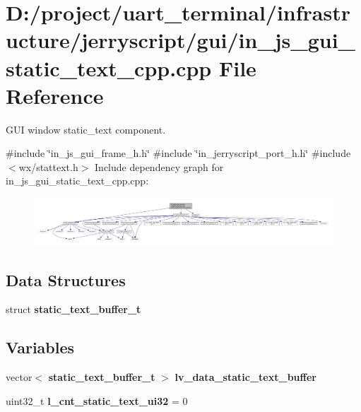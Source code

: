 \section{D\+:/project/uart\+\_\+terminal/infrastructure/jerryscript/gui/in\+\_\+js\+\_\+gui\+\_\+static\+\_\+text\+\_\+cpp.cpp File Reference}
\label{in__js__gui__static__text__cpp_8cpp}


G\+UI window static\+\_\+text component.  


{\ttfamily \#include \char`\"{}in\+\_\+js\+\_\+gui\+\_\+frame\+\_\+h.\+h\char`\"{}}\newline
{\ttfamily \#include \char`\"{}in\+\_\+jerryscript\+\_\+port\+\_\+h.\+h\char`\"{}}\newline
{\ttfamily \#include $<$wx/stattext.\+h$>$}\newline
Include dependency graph for in\+\_\+js\+\_\+gui\+\_\+static\+\_\+text\+\_\+cpp.\+cpp\+:\nopagebreak
\begin{figure}[H]
\begin{center}
\leavevmode
\includegraphics[width=350pt]{in__js__gui__static__text__cpp_8cpp__incl}
\end{center}
\end{figure}
\subsection*{Data Structures}
\begin{DoxyCompactItemize}
\item 
struct \textbf{ static\+\_\+text\+\_\+buffer\+\_\+t}
\end{DoxyCompactItemize}
\subsection*{Variables}
\begin{DoxyCompactItemize}
\item 
vector$<$ \textbf{ static\+\_\+text\+\_\+buffer\+\_\+t} $>$ \textbf{ lv\+\_\+data\+\_\+static\+\_\+text\+\_\+buffer}
\item 
uint32\+\_\+t {\bfseries l\+\_\+cnt\+\_\+static\+\_\+text\+\_\+ui32} = 0
\end{DoxyCompactItemize}



